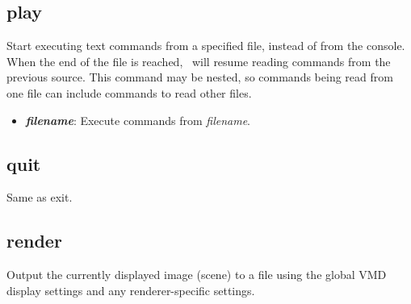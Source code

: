   \subsection{play}
Start executing text commands from a specified file, instead of from the 
console.  When the end of the file is
reached, \VMD\ will resume reading commands from the previous source.  This
command may be nested, so commands being read from one file can include
commands to read other files.

  \begin{itemize}
    \item {\bf  {\it filename}}: Execute commands from {\it filename}.
  \end{itemize}


  \subsection{quit}
Same as exit.




  \subsection{render}
Output the currently displayed image (scene) to a file using
the global VMD display settings and any renderer-specific settings.


